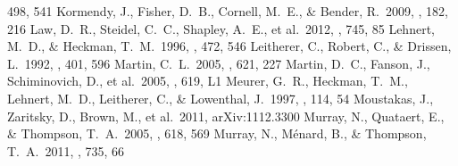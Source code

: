 \documentclass[apj]{emulateapj}
\begin{document}
\begin{thebibliography}{}
  498, 541
 Kormendy, J., Fisher, D.~B.,
  Cornell, M.~E., \& Bender, R.\ 2009, \apjs, 182, 216
 Law, D.~R., Steidel, C.~C., Shapley,
  A.~E., et al.\ 2012, \apj, 745, 85
 Lehnert, M.~D., \& Heckman,
  T.~M.\ 1996, \apj, 472, 546
 Leitherer, C., Robert, C., \&
  Drissen, L.\ 1992, \apj, 401, 596
 Martin, C.~L.\ 2005, \apj, 621, 227
 Martin, D.~C., Fanson, J.,
  Schiminovich, D., et al.\ 2005, \apjl, 619, L1
 Meurer, G.~R., Heckman, T.~M.,
  Lehnert, M.~D., Leitherer, C., \& Lowenthal, J.\ 1997, \aj, 114, 54
 Moustakas, J., Zaritsky, D.,
  Brown, M., et al.\ 2011, arXiv:1112.3300
 Murray, N., Quataert, E., \&
  Thompson, T.~A.\ 2005, \apj, 618, 569
 Murray, N., M{\'e}nard, B., \&
  Thompson, T.~A.\ 2011, \apj, 735, 66

\end{thebibliography}
\end{document}
